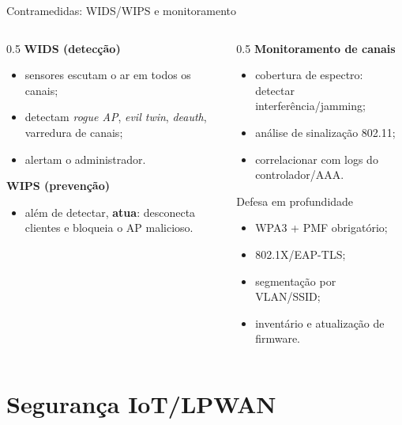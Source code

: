 \documentclass[aspectratio=169,11pt]{beamer}
\begin{document}
\begin{frame}{Contramedidas: WIDS/WIPS e monitoramento}
  \begin{columns}
    \begin{column}{0.5\textwidth}
      \textbf{WIDS (detecção)}
      \begin{itemize}
        \item sensores escutam o ar em todos os canais;
        \item detectam \emph{rogue AP}, \emph{evil twin}, \emph{deauth}, varredura de canais;
        \item alertam o administrador.
      \end{itemize}
      \textbf{WIPS (prevenção)}
      \begin{itemize}
        \item além de detectar, \textbf{atua}: desconecta clientes e bloqueia o AP malicioso.
      \end{itemize}
    \end{column}
    \begin{column}{0.5\textwidth}
      \textbf{Monitoramento de canais}
      \begin{itemize}
        \item cobertura de espectro: detectar interferência/jamming;
        \item análise de sinalização 802.11;
        \item correlacionar com logs do controlador/AAA.
      \end{itemize}
      \begin{alertblock}{Defesa em profundidade}
        \begin{itemize}
          \item WPA3 + PMF obrigatório;
          \item 802.1X/EAP-TLS;
          \item segmentação por VLAN/SSID;
          \item inventário e atualização de firmware.
        \end{itemize}
      \end{alertblock}
    \end{column}
  \end{columns}
\end{frame}

\section{Segurança IoT/LPWAN}
\end{document}
